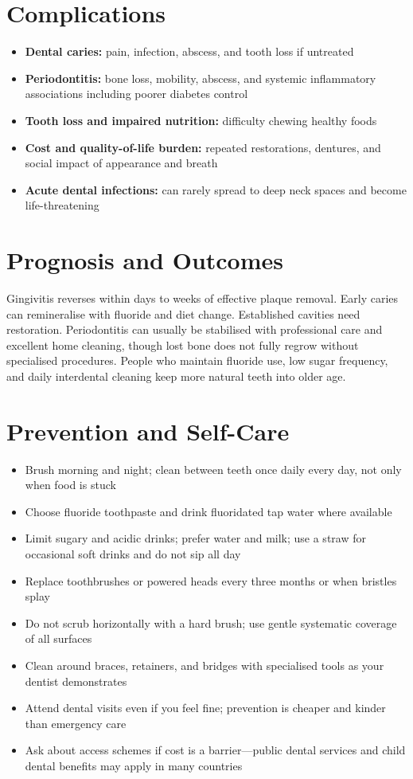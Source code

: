 \section*{Complications}
\begin{itemize}
    \item \textbf{Dental caries:} pain, infection, abscess, and tooth loss if untreated
    \item \textbf{Periodontitis:} bone loss, mobility, abscess, and systemic inflammatory associations including poorer diabetes control
    \item \textbf{Tooth loss and impaired nutrition:} difficulty chewing healthy foods
    \item \textbf{Cost and quality-of-life burden:} repeated restorations, dentures, and social impact of appearance and breath
    \item \textbf{Acute dental infections:} can rarely spread to deep neck spaces and become life-threatening
\end{itemize}

\section*{Prognosis and Outcomes}
Gingivitis reverses within days to weeks of effective plaque removal. Early caries can remineralise with fluoride and diet change. Established cavities need restoration. Periodontitis can usually be stabilised with professional care and excellent home cleaning, though lost bone does not fully regrow without specialised procedures. People who maintain fluoride use, low sugar frequency, and daily interdental cleaning keep more natural teeth into older age.

\section*{Prevention and Self-Care}
\begin{itemize}
    \item Brush morning and night; clean between teeth once daily every day, not only when food is stuck
    \item Choose fluoride toothpaste and drink fluoridated tap water where available
    \item Limit sugary and acidic drinks; prefer water and milk; use a straw for occasional soft drinks and do not sip all day
    \item Replace toothbrushes or powered heads every three months or when bristles splay
    \item Do not scrub horizontally with a hard brush; use gentle systematic coverage of all surfaces
    \item Clean around braces, retainers, and bridges with specialised tools as your dentist demonstrates
    \item Attend dental visits even if you feel fine; prevention is cheaper and kinder than emergency care
    \item Ask about access schemes if cost is a barrier---public dental services and child dental benefits may apply in many countries
\end{itemize}

